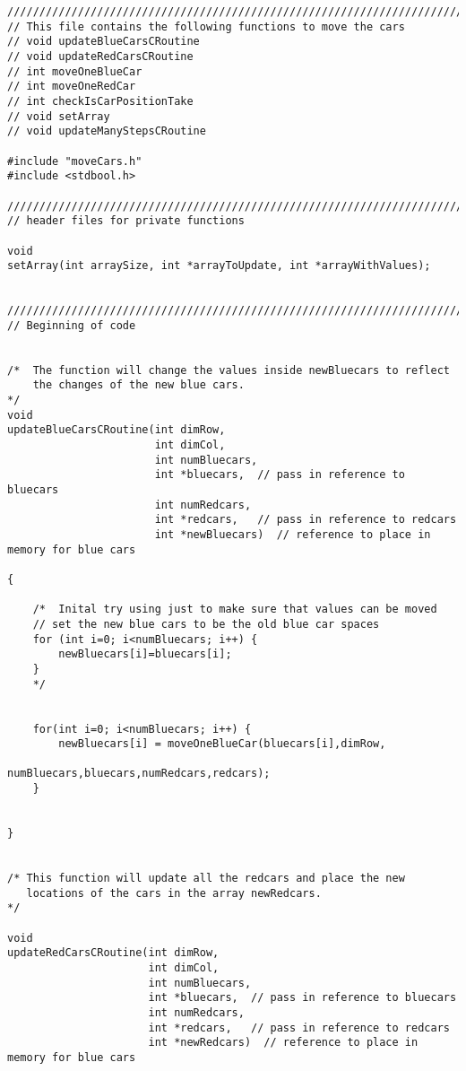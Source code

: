\documentclass[11pt]{article}
\begin{document}
\begin{verbatim}
////////////////////////////////////////////////////////////////////////////////
// This file contains the following functions to move the cars
// void updateBlueCarsCRoutine
// void updateRedCarsCRoutine
// int moveOneBlueCar
// int moveOneRedCar
// int checkIsCarPositionTake
// void setArray
// void updateManyStepsCRoutine

#include "moveCars.h"
#include <stdbool.h>

////////////////////////////////////////////////////////////////////////////////
// header files for private functions

void
setArray(int arraySize, int *arrayToUpdate, int *arrayWithValues);


////////////////////////////////////////////////////////////////////////////////
// Beginning of code


/*  The function will change the values inside newBluecars to reflect
    the changes of the new blue cars.
*/
void
updateBlueCarsCRoutine(int dimRow, 
                       int dimCol,
                       int numBluecars,
                       int *bluecars,  // pass in reference to bluecars
                       int numRedcars,
                       int *redcars,   // pass in reference to redcars
                       int *newBluecars)  // reference to place in memory for blue cars

{

    /*  Inital try using just to make sure that values can be moved
    // set the new blue cars to be the old blue car spaces
    for (int i=0; i<numBluecars; i++) {
        newBluecars[i]=bluecars[i];
    }
    */


    for(int i=0; i<numBluecars; i++) {
        newBluecars[i] = moveOneBlueCar(bluecars[i],dimRow,
                                        numBluecars,bluecars,numRedcars,redcars);
    }


}


/* This function will update all the redcars and place the new
   locations of the cars in the array newRedcars.
*/

void
updateRedCarsCRoutine(int dimRow, 
                      int dimCol,
                      int numBluecars,
                      int *bluecars,  // pass in reference to bluecars
                      int numRedcars,
                      int *redcars,   // pass in reference to redcars
                      int *newRedcars)  // reference to place in memory for blue cars


\end{verbatim}
\end{document}
